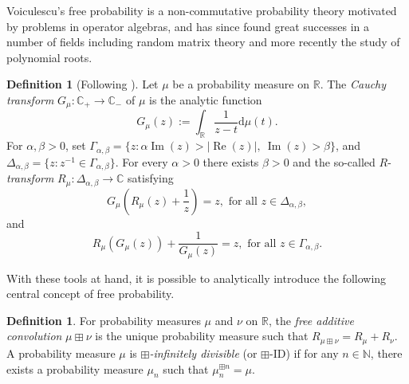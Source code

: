 \documentclass[reqno]{amsart}
\newcommand{\1}{\mathbf{1}}
\newcommand{\dd}{\mathrm{d}}
\newcommand{\C}{\mathbb{C}}
\renewcommand\Re{\operatorname{Re}}
\renewcommand\Im{\operatorname{Im}}
\newcommand{\R}{\mathbb{R}}
\newcommand{\N}{\mathbb{N}}
\def\R{\mathbb{R}}
\theoremstyle{plain}
\theoremstyle{definition}
\newtheorem{definition}[theorem]{Definition}
\theoremstyle{remark}
\numberwithin{equation}{section}
\begin{document}
Voiculescu's free probability \cite{Voiculescu1986} is a non-commutative probability theory motivated by problems in operator algebras, and has since found great successes in a number of fields including random matrix theory and more recently the study of polynomial roots. %

\begin{definition}[Following \cite{Mingo-Speicher2017}]\label{def:R transform definition}
Let $\mu$ be a probability measure on $\R$. The \emph{Cauchy transform} $G_{\mu}:\C_{+}\to\C_-$ of $\mu$ is the analytic function 
\begin{equation}
		G_{\mu}(z):=\int_{\R}\frac{1}{z-t}\dd\mu(t).\label{eq:Cauchy}
	\end{equation} 
	 For $\alpha,\beta>0$, set $\Gamma_{\alpha,\beta}=\{z:\alpha\Im(z)>|\Re(z)|,\ \Im(z)>\beta \}$, and $\Delta_{\alpha,\beta}=\{z:z^{-1}\in\Gamma_{\alpha,\beta}\}$.
	 For every $\alpha>0$ there exists $\beta>0$ and the so-called $R$-\emph{transform} $R_{\mu}\colon\Delta_{\alpha,\beta}\rightarrow\C$ satisfying \begin{equation}\label{eq:Cauchy R relationship}
		G_\mu\left(R_{\mu}(z)+\frac{1}{z}\right)=z,\text{ for all }z\in\Delta_{\alpha,\beta},
	\end{equation}  and \begin{equation*}
		R_{\mu}\left(G_{\mu}(z)\right)+\frac{1}{G_{\mu}(z)}=z,\text{ for all }z\in\Gamma_{\alpha,\beta}.
	\end{equation*} %
\end{definition} 
With these tools at hand, it is possible to analytically introduce the following central concept of free probability.
\begin{definition}\label{def:free conv}
	For probability measures $\mu$ and $\nu$ on $\R$, the \emph{free additive convolution} $\mu\boxplus\nu$ is the unique probability measure such that $R_{\mu\boxplus\nu}=R_{\mu}+R_{\nu}$. 
	A probability measure $\mu$ is $\boxplus$\emph{-infinitely divisible} (or $\boxplus$-ID) if for any $n\in\N$, there exists a probability measure $\mu_n$ such that $\mu_{n}^{\boxplus n}=\mu$.
\end{definition}
\end{document}
